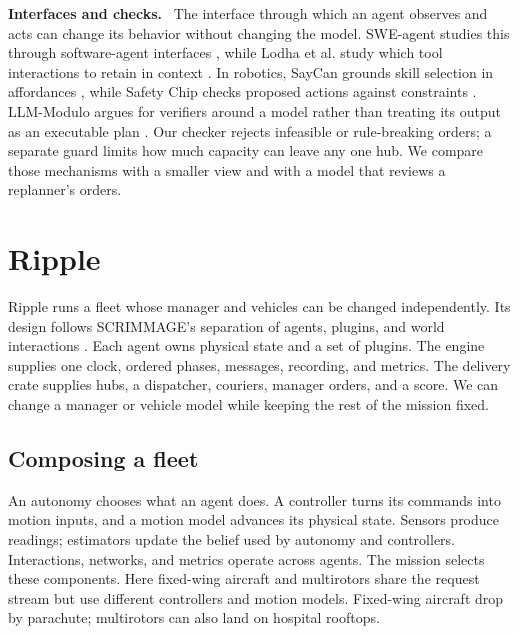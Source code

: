 \documentclass[letterpaper,10pt,conference]{ieeeconf}
\renewcommand{\paragraph}[1]{\par\textbf{#1.}\ }
\begin{document}
\paragraph{Interfaces and checks}
The interface through which an agent observes and acts can change its
behavior without changing the model. SWE-agent studies this through
software-agent interfaces \cite{yang2024sweagent}, while Lodha et al.
study which tool interactions to retain in context
\cite{lodha2026lesscontext}. In robotics, SayCan grounds skill selection
in affordances \cite{ahn2022saycan}, while Safety Chip checks
proposed actions against constraints \cite{yang2024safetychip}.
LLM-Modulo argues for verifiers around a model rather than treating its
output as an executable plan \cite{kambhampati2024llmmodulo}. Our checker
rejects infeasible or rule-breaking orders; a separate guard limits how
much capacity can leave any one hub. We compare those mechanisms with a
smaller view and with a model that reviews a replanner's orders.

\section{Ripple}
\label{sec:ripple}

Ripple runs a fleet whose manager and vehicles can be changed independently.
Its design follows SCRIMMAGE's separation of agents, plugins, and world
interactions \cite{demarco2018}. Each agent owns physical state and a set of
plugins. The engine supplies one clock, ordered phases, messages, recording,
and metrics. The delivery crate supplies hubs, a dispatcher, couriers,
manager orders, and a score. We can change a manager or vehicle model while
keeping the rest of the mission fixed.

\subsection{Composing a fleet}

An autonomy chooses what an agent does. A controller turns its commands
into motion inputs, and a motion model advances its physical state. Sensors
produce readings; estimators update the belief used by autonomy and
controllers. Interactions, networks, and metrics operate across agents.
The mission selects these components. Here fixed-wing aircraft and
multirotors share the request stream but use different controllers and
motion models. Fixed-wing aircraft drop by parachute; multirotors can also
land on hospital rooftops.
\end{document}
